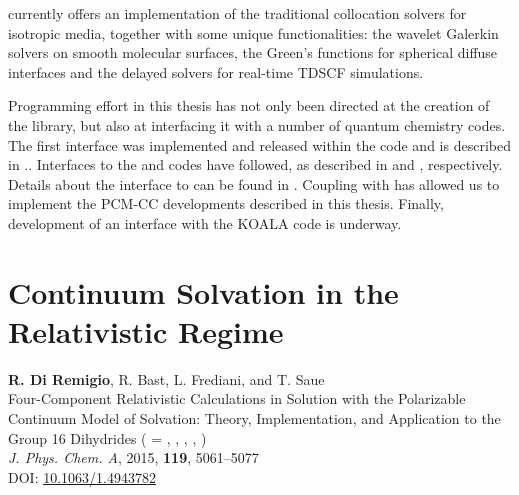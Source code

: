 \pcmsolver currently offers an implementation of the traditional collocation
solvers for isotropic media,\autocite{Tomasi2005-vm}
together with some unique functionalities: the wavelet Galerkin solvers on smooth
molecular surfaces,\autocite{Weijo2010-hy, Bugeanu2015-tp} the Green’s
functions for spherical diffuse interfaces\autocite{DiRemigio2016-nn} and
the delayed solvers for real-time \acrlong*{TDSCF}
simulations.\autocite{Corni2015-pe}

Programming effort in this thesis has not only been directed at the
creation of the \pcmsolver library, but also at interfacing it with a
number of quantum chemistry codes.
The first interface was implemented and released within the \DIRAC code
and is described in .\autocite{DIRAC15, DiRemigio2015-ou}.
Interfaces to the \LSDALTON\autocite{LSDALTON16, Aidas2013-rp} and
\DALTON\autocite{LSDALTON16, Aidas2013-rp} codes have followed, as
described in  and , respectively.\autocite{Bugeanu2015-tp, pcm-openrsp}
Details about the interface to \ReSpect\autocite{ReSpect-3.5.0} can be
found in .\autocite{pcm-respect}
Coupling with \psicode\autocite{Turney2012-de} has allowed us to implement the
\acrshort{PCM}-\acrshort{CC} developments described in this thesis.
Finally, development of an interface with the KOALA code is underway.\autocite{Hofener2014-ex, Hofener2016-qz}

\section{Continuum Solvation in the Relativistic Regime}\label{sec:relapcm}

\begin{tcolorbox}
  {\small
  \textbf{R. Di Remigio}, R. Bast, L. Frediani, and T. Saue
  \\
  \textsf{
  Four-Component Relativistic Calculations in Solution with the
  Polarizable Continuum Model of Solvation: Theory,
  Implementation, and Application to the Group 16 Dihydrides
   ( = , , , ,
  )
  }
  \\
  \textit{J. Phys. Chem. A}, \textrm{2015}, \textbf{119}, 5061--5077
  \\
  DOI: \url{10.1063/1.4943782}
  }
\end{tcolorbox}

